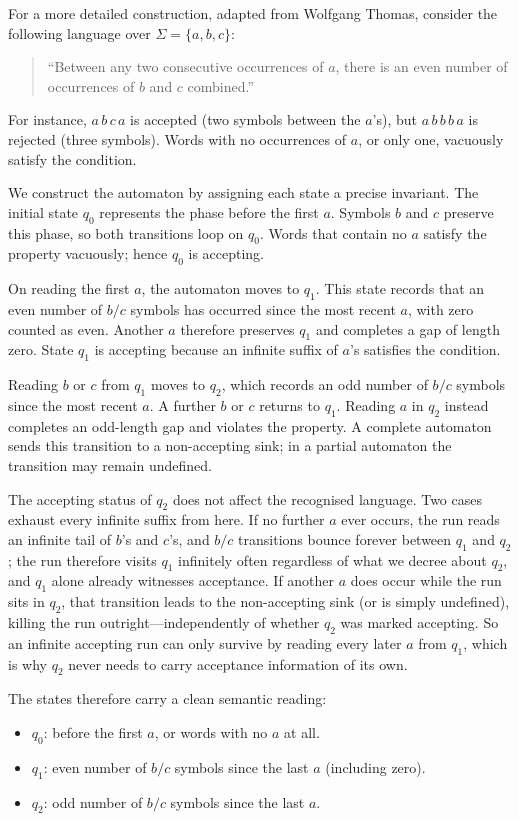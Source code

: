 \begin{example}
\label{ex:buchi-parity-thomas}
For a more detailed construction, adapted from Wolfgang Thomas, consider
the following language over $\Sigma=\{a,b,c\}$:
\begin{quote}
``Between any two consecutive occurrences of $a$, there is an even number of occurrences of $b$ and $c$ combined.''
\end{quote}
For instance, $a\,b\,c\,a$ is accepted (two symbols between the $a$'s), but $a\,b\,b\,b\,a$ is rejected (three symbols).  Words with no occurrences of $a$, or only one, vacuously satisfy the condition.

We construct the automaton by assigning each state a precise invariant.
The initial state $q_0$ represents the phase before the first $a$.
Symbols $b$ and $c$ preserve this phase, so both transitions loop on
$q_0$.  Words that contain no $a$ satisfy the property vacuously; hence
$q_0$ is accepting.

On reading the first $a$, the automaton moves to $q_1$.  This state records
that an even number of $b/c$ symbols has occurred since the most recent
$a$, with zero counted as even.  Another $a$ therefore preserves $q_1$
and completes a gap of length zero.  State $q_1$ is accepting because an
infinite suffix of $a$'s satisfies the condition.

Reading $b$ or $c$ from $q_1$ moves to $q_2$, which records an odd number
of $b/c$ symbols since the most recent $a$.  A further $b$ or $c$ returns
to $q_1$.  Reading $a$ in $q_2$ instead completes an odd-length gap and
violates the property.  A complete automaton sends this transition to a
non-accepting sink; in a partial automaton the transition may remain
undefined.

The accepting status of $q_2$ does not affect the recognised language.
Two cases exhaust every infinite suffix from here.  If no further $a$
ever occurs, the run reads an infinite tail of $b$'s and $c$'s, and $b/c$
transitions bounce forever between $q_1$ and $q_2$; the run therefore
visits $q_1$ infinitely often regardless of what we decree about $q_2$,
and $q_1$ alone already witnesses acceptance.  If another $a$ does occur
while the run sits in $q_2$, that transition leads to the non-accepting
sink (or is simply undefined), killing the run outright---independently
of whether $q_2$ was marked accepting.  So an infinite accepting run can
only survive by reading every later $a$ from $q_1$, which is why $q_2$
never needs to carry acceptance information of its own.

The states therefore carry a clean semantic reading:
\begin{itemize}[nosep]
  \item $q_0$: before the first $a$, or words with no $a$ at all.
  \item $q_1$: even number of $b/c$ symbols since the last $a$ (including zero).
  \item $q_2$: odd number of $b/c$ symbols since the last $a$.
\end{itemize}
\end{example}

